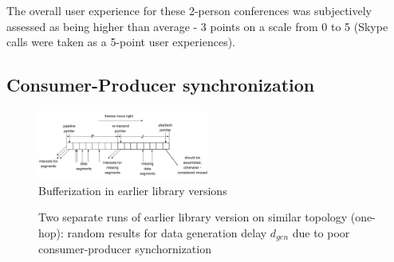 \documentclass{icn/sig-alternate-2012} %
\begin{document}
The overall user experience for these 2-person conferences was subjectively assessed as being higher than average - 3 points on a scale from 0 to 5 (Skype calls were taken as a 5-point user experiences).

\subsection{Consumer-Producer synchronization}

\begin{figure}[t!]
\centering
\includegraphics[width=0.5\textwidth]{buffer}
\caption{Bufferization in earlier library versions}
\label{fig:old-buf}
\end{figure}

\begin{figure}[t!]
\centering


\caption{Two separate runs of earlier library version on similar topology (one-hop): random results for data generation delay $d_{gen}$ due to poor consumer-producer synchornization}
\label{fig:dgen}
\end{figure}
\end{document}
